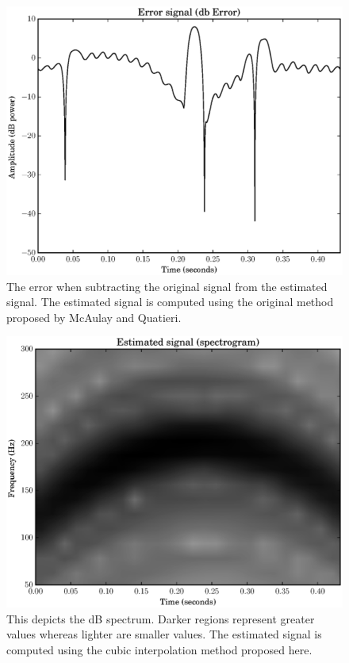 \begin{figure}[!t]
    \includegraphics[width=\textwidth]{plots/mq_cubic_error.eps}
    \caption{
        The error when subtracting the original signal from the estimated
        signal. The estimated signal is computed using the original method
        proposed by McAulay and Quatieri.
    \label{plot:mqcubicerror}}
\end{figure}


\begin{figure}[!t]
    \includegraphics[width=\textwidth]{plots/mq_mod_cubic_estimated_spec.eps}
    \caption{This depicts the dB spectrum. Darker regions represent greater
        values whereas lighter are smaller values. The estimated signal is
        computed using the cubic interpolation method proposed here.
    \label{plot:mqmodcubicestimatedspec}}
\end{figure}

